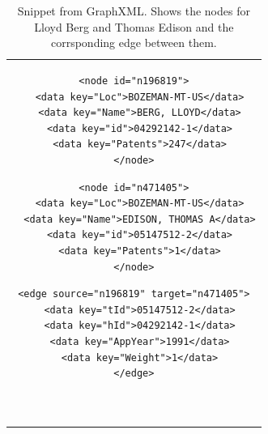 \begin{table}[h] 
  \centering
  \begin{tabular}{@{}c@{}} 

  \begin{minipage}{0.25\linewidth}

\begin{lstlisting}[]
<node id="n196819">
  <data key="Loc">BOZEMAN-MT-US</data>
  <data key="Name">BERG, LLOYD</data>
  <data key="id">04292142-1</data>
  <data key="Patents">247</data>
</node>
\end{lstlisting}

  \end{minipage}
  \hspace{0.05\linewidth}
  \begin{minipage}{0.3\linewidth}

\begin{lstlisting}[]
<node id="n471405">
  <data key="Loc">BOZEMAN-MT-US</data>
  <data key="Name">EDISON, THOMAS A</data>
  <data key="id">05147512-2</data>
  <data key="Patents">1</data>
</node>
\end{lstlisting}

  \end{minipage}
  \hspace{0.05\linewidth}
  \begin{minipage}{0.3\linewidth}

\begin{lstlisting}[]
<edge source="n196819" target="n471405">
  <data key="tId">05147512-2</data>
  <data key="hId">04292142-1</data>
  <data key="AppYear">1991</data>
  <data key="Weight">1</data>
</edge>



\end{lstlisting}

  \end{minipage}
  
  \end{tabular}

\label{listing}
\caption{\footnotesize Snippet from GraphXML. Shows the nodes for Lloyd Berg and Thomas Edison and the corrsponding edge between them.}
\end{table}